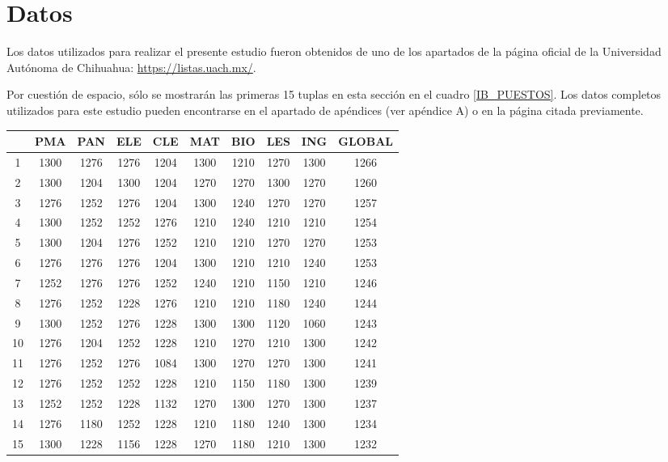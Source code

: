 \documentclass{article}
\begin{document}
\section{Datos}

Los datos utilizados para realizar el presente estudio fueron obtenidos de uno de los apartados de la página oficial de la Universidad Autónoma de Chihuahua: \url{https://listas.uach.mx/}.

Por cuestión de espacio, sólo se mostrarán las primeras 15 tuplas en esta sección en el cuadro \ref{IB_PUESTOS}. Los datos completos utilizados para este estudio pueden encontrarse en el apartado de apéndices (ver apéndice A) o en la página citada previamente.

\begin{table}[H]
\centering
\begin{tabular}{c|c|c|c|c|c|c|c|c|c|}
\cline{2-10}
\multicolumn{1}{l|}{} & \textbf{PMA} & \textbf{PAN} & \textbf{ELE} & \textbf{CLE} & \textbf{MAT} & \textbf{BIO} & \textbf{LES} & \textbf{ING} & \textbf{GLOBAL} \\ \hline
\multicolumn{1}{|c|}{1}  & 1300 & 1276 & 1276 & 1204 & 1300 & 1210 & 1270 & 1300 & 1266 \\ \hline
\multicolumn{1}{|c|}{2}  & 1300 & 1204 & 1300 & 1204 & 1270 & 1270 & 1300 & 1270 & 1260 \\ \hline
\multicolumn{1}{|c|}{3}  & 1276 & 1252 & 1276 & 1204 & 1300 & 1240 & 1270 & 1270 & 1257 \\ \hline
\multicolumn{1}{|c|}{4}  & 1300 & 1252 & 1252 & 1276 & 1210 & 1240 & 1210 & 1210 & 1254 \\ \hline
\multicolumn{1}{|c|}{5}  & 1300 & 1204 & 1276 & 1252 & 1210 & 1210 & 1270 & 1270 & 1253 \\ \hline
\multicolumn{1}{|c|}{6}  & 1276 & 1276 & 1276 & 1204 & 1300 & 1210 & 1210 & 1240 & 1253 \\ \hline
\multicolumn{1}{|c|}{7}  & 1252 & 1276 & 1276 & 1252 & 1240 & 1210 & 1150 & 1210 & 1246 \\ \hline
\multicolumn{1}{|c|}{8}  & 1276 & 1252 & 1228 & 1276 & 1210 & 1210 & 1180 & 1240 & 1244 \\ \hline
\multicolumn{1}{|c|}{9}  & 1300 & 1252 & 1276 & 1228 & 1300 & 1300 & 1120 & 1060 & 1243 \\ \hline
\multicolumn{1}{|c|}{10} & 1276 & 1204 & 1252 & 1228 & 1210 & 1270 & 1210 & 1300 & 1242 \\ \hline
\multicolumn{1}{|c|}{11} & 1276 & 1252 & 1276 & 1084 & 1300 & 1270 & 1270 & 1300 & 1241 \\ \hline
\multicolumn{1}{|c|}{12} & 1276 & 1252 & 1252 & 1228 & 1210 & 1150 & 1180 & 1300 & 1239 \\ \hline
\multicolumn{1}{|c|}{13} & 1252 & 1252 & 1228 & 1132 & 1270 & 1300 & 1270 & 1300 & 1237 \\ \hline
\multicolumn{1}{|c|}{14} & 1276 & 1180 & 1252 & 1228 & 1210 & 1180 & 1240 & 1300 & 1234 \\ \hline
\multicolumn{1}{|c|}{15} & 1300 & 1228 & 1156 & 1228 & 1270 & 1180 & 1210 & 1300 & 1232 \\ \hline
\end{tabular}


\end{table}
\end{document}

